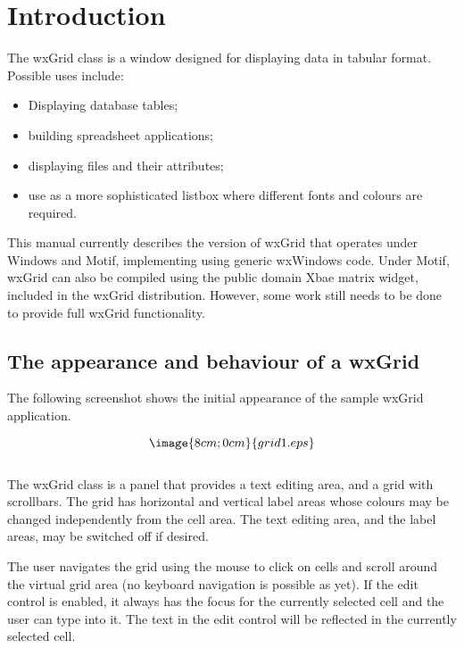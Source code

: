 \chapter{Introduction}\label{introduction}
%
%
\setfooter{\thepage}{}{}{}{}{\thepage}%

The wxGrid class is a window designed for displaying data in tabular
format. Possible uses include:

\begin{itemize}\itemsep=0pt
\item Displaying database tables;
\item building spreadsheet applications;
\item displaying files and their attributes;
\item use as a more sophisticated listbox where different fonts and colours are required.
\end{itemize}

This manual currently describes the version of wxGrid that operates
under Windows and Motif, implementing using generic wxWindows code.
Under Motif, wxGrid can also be compiled using the public domain Xbae
matrix widget, included in the wxGrid distribution. However, some work
still needs to be done to provide full wxGrid functionality. 

\section{The appearance and behaviour of a wxGrid}\label{appearance}

The following screenshot shows the initial appearance of the sample wxGrid application.

$$\image{8cm;0cm}{grid1.eps}$$\\

The wxGrid class is a panel that provides a text editing area, and a grid with scrollbars.
The grid has horizontal and vertical label areas whose colours may be changed independently
from the cell area. The text editing area, and the label areas, may be switched off
if desired.

The user navigates the grid using the mouse to click on cells and scroll around the
virtual grid area (no keyboard navigation is possible as yet). If the edit
control is enabled, it always has the focus for the currently selected cell
and the user can type into it. The text in the edit control will be reflected
in the currently selected cell.

